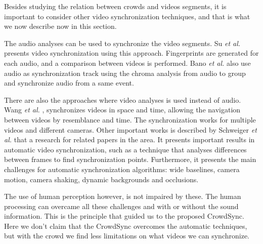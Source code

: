 Besides studying the relation between crowds and videos segments, it is important to consider other video synchronization techniques, and that is what we now describe now in this section.

The audio analyses can be used to synchronize the video segments. Su \textit{et al.} \cite{su2012making} presents video synchronization using this approach. Fingerprints are generated for each audio, and a comparison between videos is performed. Bano \textit{et al.} \cite{bano2015discovery} also use audio as synchronization track using the chroma analysis from audio to group and synchronize audio from a same event.

There are also the approaches where video analyses is used instead of audio. Wang \textit{et al.} \cite{wang2014videosnapping}, synchronizes videos in space and time, allowing the navigation between videos by resemblance and time. The synchronization works for multiple videos and different cameras. Other important works is described by Schweiger \textit{et al.} \cite{schweiger2013fully} that a research for related papers in the area. It presents important results in automatic video synchronization, such as a technique that analyses differences between frames to find synchronization points. Furthermore, it presents the main challenges for automatic synchronization algorithms: wide baselines, camera motion, camera shaking, dynamic backgrounds and occlusions.

The use of human perception however, is not impaired by these. The human processing can overcame all these challenges and with or without the sound information. This is the principle that guided us to the proposed CrowdSync. Here we don't claim that the CrowdSync overcomes the automatic techniques, but with the crowd we find less limitations on what videos we can synchronize.